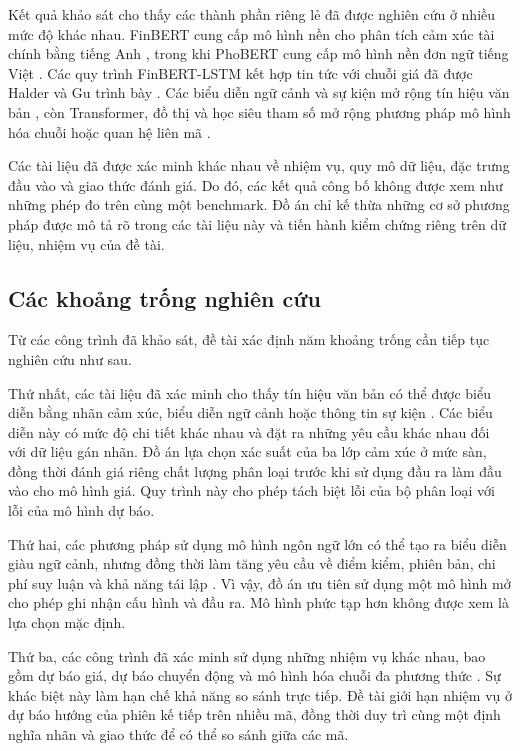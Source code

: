 \documentclass[12pt, a4paper, oneside]{report}
\begin{document}
Kết quả khảo sát cho thấy các thành phần riêng lẻ đã được nghiên cứu ở nhiều mức độ khác nhau.
FinBERT cung cấp mô hình nền cho phân tích cảm xúc tài chính bằng tiếng Anh
\cite{Yang2020_200608097v2}, trong khi PhoBERT cung cấp mô hình nền đơn ngữ tiếng Việt
\cite{Nguyen2020_200300744v3}. Các quy trình FinBERT-LSTM kết hợp tin tức với chuỗi giá
đã được Halder và Gu trình bày \cite{Halder2022_221107392v1,Gu2024_240716150v1}.
Các biểu diễn ngữ cảnh và sự kiện mở rộng tín hiệu văn bản
\cite{Chen2021_210708721v1,Chen2019_191005078v1}, còn Transformer, đồ thị và
học siêu tham số mở rộng phương pháp mô hình hóa chuỗi hoặc quan hệ liên mã
\cite{Omranpour2024_241210540v1,Boyle2023_230503835v1,
Xu2021_211013716v2,Zhao2023_230609862v3}.

Các tài liệu đã được xác minh khác nhau về nhiệm vụ, quy mô dữ liệu, đặc trưng đầu vào và giao
thức đánh giá. Do đó, các kết quả công bố không được xem như những phép đo trên cùng một benchmark. Đồ án chỉ kế thừa những cơ sở phương pháp được mô tả rõ trong
các tài liệu này và tiến hành kiểm chứng riêng trên dữ liệu, nhiệm vụ của đề tài.

\subsection{Các khoảng trống nghiên cứu}

Từ các công trình đã khảo sát, đề tài xác định năm khoảng trống cần tiếp tục nghiên
cứu như sau.

Thứ nhất, các tài liệu đã xác minh cho thấy tín hiệu văn bản có thể được biểu diễn bằng
nhãn cảm xúc, biểu diễn ngữ cảnh hoặc thông tin sự kiện
\cite{Chen2019_191005078v1,Chen2021_210708721v1}. Các biểu diễn này có mức độ chi tiết
khác nhau và đặt ra những yêu cầu khác nhau đối với dữ liệu gán nhãn. Đồ án lựa chọn xác suất của
ba lớp cảm xúc ở mức sàn, đồng thời đánh giá riêng chất lượng phân loại trước khi sử dụng
đầu ra làm đầu vào cho mô hình giá. Quy trình này cho phép tách biệt lỗi của bộ phân loại
với lỗi của mô hình dự báo.

Thứ hai, các phương pháp sử dụng mô hình ngôn ngữ lớn có thể tạo ra biểu diễn giàu ngữ cảnh,
nhưng đồng thời làm tăng yêu cầu về điểm kiểm, phiên bản, chi phí suy luận và khả năng tái
lập \cite{Elahi2024_241101368v1,Liang2024_241210823v2,Siala2026_260200086v3}. Vì vậy,
đồ án ưu tiên sử dụng một mô hình mở cho phép ghi nhận cấu hình và đầu ra. Mô hình
phức tạp hơn không được xem là lựa chọn mặc định.

Thứ ba, các công trình đã xác minh sử dụng những nhiệm vụ khác nhau, bao gồm dự báo giá,
dự báo chuyển động và mô hình hóa chuỗi đa phương thức
\cite{Halder2022_221107392v1,Gu2024_240716150v1,Chen2021_210708721v1,
Omranpour2024_241210540v1}. Sự khác biệt này làm hạn chế khả năng so sánh trực tiếp.
Đề tài giới hạn nhiệm vụ ở dự báo hướng của phiên kế tiếp trên nhiều mã, đồng thời
duy trì cùng một định nghĩa nhãn và giao thức để có thể so sánh giữa các mã.
\end{document}
